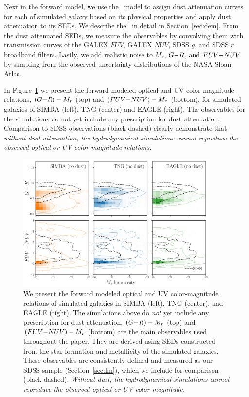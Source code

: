 Next in the forward model, we use the \eda~model to assign dust attenuation
curves for each of simulated galaxy based on its physical properties and apply
dust attenuation to its SEDs. We describe the \eda~in detail in Section~\ref{sec:dem}. 
From the dust attenuated SEDs, we measure the observables by convolving them
with transmission curves of the GALEX $FUV$, GALEX $NUV$, SDSS $g$, and SDSS $r$
broadband filters. Lastly, we add realistic noise to $M_r$, $G{-}R$, and $FUV{-}NUV$ 
by sampling from the observed uncertainty distributions of the NASA
Sloan-Atlas. 

In Figure~\ref{fig:obs} we present the forward modeled optical and UV color-magnitude
relations, $(G{-}R)-M_r$ (top) and $(FUV{-}NUV)-M_r$ (bottom), for simulated galaxies
of SIMBA (left), TNG (center) and EAGLE (right). The observables for the
simulations do not yet include any prescription for dust attenuation.
Comparison to SDSS observations (black dashed) clearly demonstrate
that {\em without dust attenuation, the hydrodynamical simulations cannot
reproduce the observed optical or UV color-magnitude relations.}

\begin{figure}
\begin{center}
\includegraphics[width=0.9\textwidth]{figs/observables.pdf} 
    \caption{\label{fig:obs}
    We present the forward modeled optical and UV color-magnitude relations of 
    simulated galaxies in SIMBA (left), TNG (center), and EAGLE (right). The
    simulations above do {\em not} yet include any prescription for dust
    attenuation.  $(G{-}R)-M_r$ (top) and $(FUV{-}NUV)-M_r$ (bottom) are the
    main observables used throughout the paper. They are derived using SEDs
    constructed from the star-formation and metallicity of the simulated
    galaxies. These observables are consistently defined and measured as our
    SDSS sample (Section~\ref{sec:fm}), which we include for comparison (black
    dashed). {\em Without dust, the hydrodynamical simulations cannot reproduce
    the observed optical or UV color-magnitude.}
    }
\end{center}
\end{figure}
